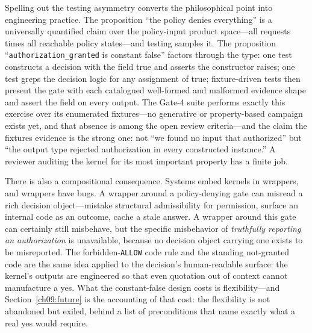Spelling out the testing asymmetry converts the philosophical point into engineering practice. The proposition ``the policy denies everything'' is a universally quantified claim over the policy-input product space---all requests times all reachable policy states---and testing samples it. The proposition ``\texttt{authorization\_granted} is constant false'' factors through the type: one test constructs a decision with the field true and asserts the constructor raises; one test greps the decision logic for any assignment of true; fixture-driven tests then present the gate with each catalogued well-formed and malformed evidence shape and assert the field on every output. The Gate-4 suite performs exactly this exercise over its enumerated fixtures---no generative or property-based campaign exists yet, and that absence is among the open review criteria---and the claim the fixtures evidence is the strong one: not ``we found no input that authorized'' but ``the output type rejected authorization in every constructed instance.'' A reviewer auditing the kernel for its most important property has a finite job.

There is also a compositional consequence. Systems embed kernels in wrappers, and wrappers have bugs. A wrapper around a policy-denying gate can misread a rich decision object---mistake structural admissibility for permission, surface an internal code as an outcome, cache a stale answer. A wrapper around this gate can certainly still misbehave, but the specific misbehavior of \emph{truthfully reporting an authorization} is unavailable, because no decision object carrying one exists to be misreported. The forbidden-\texttt{ALLOW} code rule and the standing not-granted code are the same idea applied to the decision's human-readable surface: the kernel's outputs are engineered so that even quotation out of context cannot manufacture a yes. What the constant-false design costs is flexibility---and Section~\ref{ch09:future} is the accounting of that cost: the flexibility is not abandoned but exiled, behind a list of preconditions that name exactly what a real yes would require.

